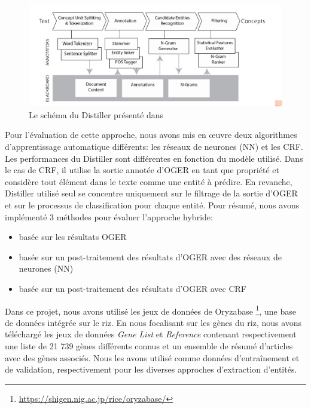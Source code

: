 \begin{figure}[!ht]
\begin{center}
	\includegraphics[width=1\textwidth]{Figures/distiller.png}
\end{center}
\caption{\label{distiller} Le schéma du Distiller présenté dans ~\cite{Basaldella2017}}
\end{figure}

Pour l'évaluation de cette approche, nous avons mis en œuvre deux algorithmes d’apprentissage automatique différents: les réseaux de neurones (NN) et les CRF. Les performances du Distiller sont différentes en fonction du modèle utilisé. Dans le cas de CRF, il utilise la sortie annotée d'OGER en tant que propriété et considère tout élément dans le texte comme une entité à prédire. En revanche, Distiller utilisé seul se concentre uniquement sur le filtrage de la sortie d'OGER et sur le processus de classification pour chaque entité. Pour résumé, nous avons implémenté 3 méthodes pour évaluer l'approche hybride: \\
\begin{itemize}
\item basée sur les résultats OGER
\item basée sur un post-traitement des résultats d'OGER avec des réseaux de neurones (NN) 
\item basée sur un post-traitement des résultats d'OGER avec CRF\\
\end{itemize}


Dans ce projet, nous avons utilisé les jeux de données de Oryzabase \footnote {\url{https://shigen.nig.ac.jp/rice/oryzabase/}}, une base de données intégrée sur le riz. En nous focalisant sur les gènes du riz, nous avons téléchargé les jeux de données \textit{Gene List} et \textit{Reference} contenant respectivement une liste de 21 739 gènes différents connus et un ensemble de résumé d'articles avec des gènes associés. Nous les avons utilisé comme données d'entraînement et de validation, respectivement pour les diverses approches d'extraction d'entités.

